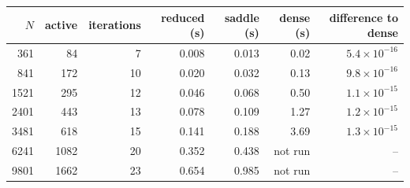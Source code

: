 \begin{tabular}{rrrrrrr}
\toprule
$N$ & active & iterations & reduced (s) & saddle (s) & dense (s) & difference to dense \\
\midrule
361 & 84 & 7 & 0.008 & 0.013 & 0.02 & $5.4\times10^{-16}$ \\
841 & 172 & 10 & 0.020 & 0.032 & 0.13 & $9.8\times10^{-16}$ \\
1521 & 295 & 12 & 0.046 & 0.068 & 0.50 & $1.1\times10^{-15}$ \\
2401 & 443 & 13 & 0.078 & 0.109 & 1.27 & $1.2\times10^{-15}$ \\
3481 & 618 & 15 & 0.141 & 0.188 & 3.69 & $1.3\times10^{-15}$ \\
6241 & 1082 & 20 & 0.352 & 0.438 & not run & -- \\
9801 & 1662 & 23 & 0.654 & 0.985 & not run & -- \\
\bottomrule
\end{tabular}
